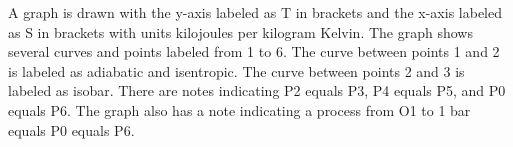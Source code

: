 A graph is drawn with the y-axis labeled as T in brackets and the x-axis labeled as S in brackets with units kilojoules per kilogram Kelvin. The graph shows several curves and points labeled from 1 to 6. The curve between points 1 and 2 is labeled as adiabatic and isentropic. The curve between points 2 and 3 is labeled as isobar. There are notes indicating P2 equals P3, P4 equals P5, and P0 equals P6. The graph also has a note indicating a process from O1 to 1 bar equals P0 equals P6.